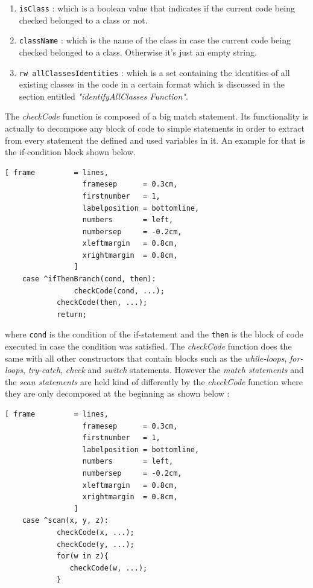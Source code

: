 \documentclass[11pt]{report}
\begin{document}
\begin{enumerate}
\item \texttt{isClass} : which is a boolean value that indicates if the current code being checked belonged to a class or not.
\item \texttt{className} : which is the name of the class in case the current code being checked belonged to a class. Otherwise it's just an empty string.
\item \texttt{rw allClassesIdentities} : which is a set containing the identities of all existing classes in the code in a certain format which is discussed in the section entitled \textsl{"identifyAllClasses Function"}.
\end{enumerate}

The \textsl{checkCode} function is composed of a big match statement. Its functionality is actually to decompose any block of code to simple statements in order to extract from every statement the defined and used variables in it. An example for that is the if-condition block shown below.
\begin{Verbatim}[ frame         = lines, 
                  framesep      = 0.3cm, 
                  firstnumber   = 1,
                  labelposition = bottomline,
                  numbers       = left,
                  numbersep     = -0.2cm,
                  xleftmargin   = 0.8cm,
                  xrightmargin  = 0.8cm,
                ]
    case ^ifThenBranch(cond, then): 
        		checkCode(cond, ...);
			checkCode(then, ...);
			return;
\end{Verbatim}
where \texttt{cond} is the condition of the if-statement and the \texttt{then} is the block of code executed in case the condition was satisfied. The \textsl{checkCode} function does the same with all other constructors that contain blocks such as the \textsl{while-loops}, \textsl{for-loops}, \textsl{try-catch}, \textsl{check} and \textsl{switch} statements. However the \textsl{match statements} and the \textsl{scan statements} are held kind of differently by the \textsl{checkCode} function where they are only decomposed at the beginning as shown below :
\begin{Verbatim}[ frame         = lines, 
                  framesep      = 0.3cm, 
                  firstnumber   = 1,
                  labelposition = bottomline,
                  numbers       = left,
                  numbersep     = -0.2cm,
                  xleftmargin   = 0.8cm,
                  xrightmargin  = 0.8cm,
                ]
    case ^scan(x, y, z): 
    		checkCode(x, ...);
    		checkCode(y, ...);
	    	for(w in z){
	       	   checkCode(w, ...);
	    	}
\end{Verbatim}
\end{document}
